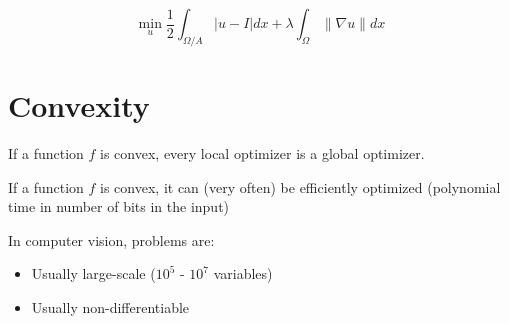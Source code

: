 \begin{exmp}[Inpainting]
  \begin{equation}
    \label{eq:5}
    \min_{u} \frac{1}{2} \int_{\Omega / A} | u - I | dx + \lambda
      \int_{\Omega} \| \nabla u \| dx
  \end{equation}
\end{exmp}

\section{Convexity}
\label{sec:convexity}

\begin{boxthm}
  If a function $f$ is convex, every local optimizer is a global optimizer.
\end{boxthm}

\begin{boxthm}
  If a function $f$ is convex, it can (very often) be efficiently
  optimized (polynomial time in number of bits in the input)
\end{boxthm}

In computer vision, problems are:

\begin{itemize}
\item Usually large-scale ($10^5$ - $10^7$ variables)
\item Usually non-differentiable
\end{itemize}

